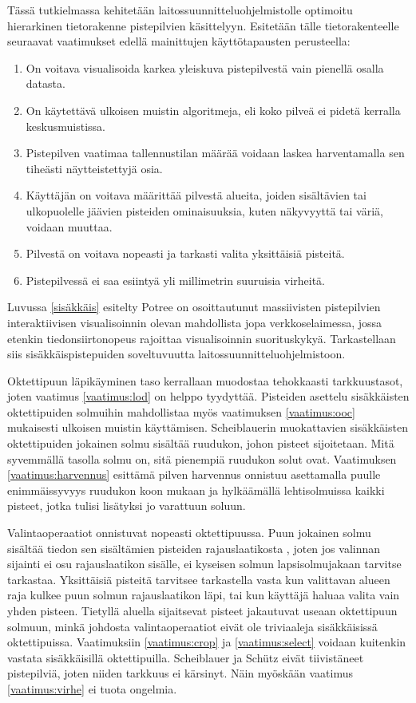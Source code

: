 Tässä tutkielmassa kehitetään laitossuunnitteluohjelmistolle optimoitu hierarkinen tietorakenne pistepilvien käsittelyyn. Esitetään tälle tietorakenteelle seuraavat vaatimukset edellä mainittujen käyttötapausten perusteella:
\begin{enumerate}
    \item \label{vaatimus:lod} On voitava visualisoida karkea yleiskuva pistepilvestä vain pienellä osalla datasta. 
    \item \label{vaatimus:ooc} On käytettävä ulkoisen muistin algoritmeja, eli koko pilveä ei pidetä kerralla keskusmuistissa.
    \item \label{vaatimus:harvennus} Pistepilven vaatimaa tallennustilan määrää voidaan laskea harventamalla sen tiheästi näytteistettyjä osia. 
    \item \label{vaatimus:crop} Käyttäjän on voitava määrittää pilvestä alueita, joiden sisältävien tai ulkopuolelle jäävien pisteiden ominaisuuksia, kuten näkyvyyttä tai väriä, voidaan muuttaa.
    \item \label{vaatimus:select} Pilvestä on voitava nopeasti ja tarkasti valita yksittäisiä pisteitä.
    \item \label{vaatimus:virhe} Pistepilvessä ei saa esiintyä yli millimetrin suuruisia virheitä.
\end{enumerate}

Luvussa \ref{sisäkkäis} esitelty Potree on osoittautunut massiivisten pistepilvien interaktiivisen visualisoinnin olevan mahdollista jopa verkkoselaimessa, jossa etenkin tiedonsiirtonopeus rajoittaa visualisoinnin suorituskykyä. Tarkastellaan siis sisäkkäispistepuiden soveltuvuutta laitossuunnitteluohjelmistoon. 

Oktettipuun läpikäyminen taso kerrallaan muodostaa tehokkaasti tarkkuustasot, joten vaatimus \ref{vaatimus:lod} on helppo tyydyttää. Pisteiden asettelu sisäkkäisten oktettipuiden solmuihin mahdollistaa myös vaatimuksen \ref{vaatimus:ooc} mukaisesti ulkoisen muistin käyttämisen. Scheiblauerin muokattavien sisäkkäisten oktettipuiden jokainen solmu sisältää ruudukon, johon pisteet sijoitetaan. Mitä syvemmällä tasolla solmu on, sitä pienempiä ruudukon solut ovat. Vaatimuksen \ref{vaatimus:harvennus} esittämä pilven harvennus onnistuu asettamalla puulle enimmäissyvyys ruudukon koon mukaan ja hylkäämällä lehtisolmuissa kaikki pisteet, jotka tulisi lisätyksi jo varattuun soluun. 

Valintaoperaatiot onnistuvat nopeasti oktettipuussa. Puun jokainen solmu sisältää tiedon sen sisältämien pisteiden rajauslaatikosta , joten jos valinnan sijainti ei osu rajauslaatikon sisälle, ei kyseisen solmun lapsisolmujakaan tarvitse tarkastaa. Yksittäisiä pisteitä tarvitsee tarkastella vasta kun valittavan alueen raja kulkee puun solmun rajauslaatikon läpi, tai kun käyttäjä haluaa valita vain yhden pisteen. Tietyllä aluella sijaitsevat pisteet jakautuvat useaan oktettipuun solmuun, minkä johdosta valintaoperaatiot eivät ole triviaaleja sisäkkäisissä oktettipuissa. Vaatimuksiin \ref{vaatimus:crop} ja \ref{vaatimus:select} voidaan kuitenkin vastata sisäkkäisillä oktettipuilla. Scheiblauer ja Schütz eivät tiivistäneet pistepilviä, joten niiden tarkkuus ei kärsinyt. Näin myöskään vaatimus \ref{vaatimus:virhe} ei tuota ongelmia.

